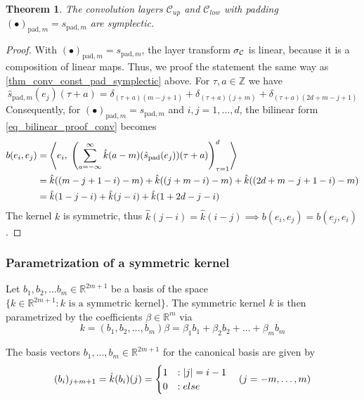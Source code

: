 \documentclass[twoside,a4paper]{article}
\newtheorem{theorem}{Theorem}
\begin{document}
\begin{theorem}
	The convolution layers $\mathcal{C}_{up}$ and $\mathcal{C}_{low}$
	with padding $(\bullet)_{\text{pad},m} = s_{\text{pad},m}$ are symplectic.
\end{theorem}
\begin{proof}
	With $(\bullet)_{\text{pad},m} = s_{\text{pad},m}$, the layer transform 
	$\sigma_{\mathcal{C}}$ is linear, because it is a composition of linear maps. Thus,
	we proof the statement the same way as \cref{thm_conv_const_pad_symplectic} above.
	For $\tau,a \in \mathbb{Z}$ we have
	\begin{equation*}
		\hat{s}_{\text{pad},m}(e_j)(\tau + a) = 
		\delta_{(\tau + a) (m-j+1)} + \delta_{(\tau + a) (j+m)} + \delta_{(\tau + a) (2d+m-j+1)}
	\end{equation*}
	Consequently, for $(\bullet)_{\text{pad},m} = s_{\text{pad},m}$ and $i,j=1, \dots, d$, 
	the bilinear form \cref{eq_bilinear_proof_conv} becomes
	\begin{align*}
		b(e_i, e_j) &= \left\langle e_i,\; 
			\left( \sum_{a=-\infty}^{\infty} 
				\hat{k}(a-m)
				(\hat{s}_{\text{pad}}(e_j))(\tau+a)
			\right)_{\tau=1}^d
		 \right\rangle \\
		&= \hat{k}((m-j+1-i)-m) + \hat{k}((j+m-i)-m) + \hat{k}((2d+m-j+1-i)-m) \\
		&= \hat{k}(1-j-i) + \hat{k}(j-i) + \hat{k}(1+2d-j-i)
	\end{align*}
	The kernel $k$ is symmetric, thus $\hat{k}(j-i) = \hat{k}(i-j) \implies b(e_i, e_j) = b(e_j,e_i)$.
\end{proof}

\subsubsection*{Parametrization of a symmetric kernel}

Let ${b_1, b_2, \dots b_m} \in \mathbb{R}^{2m+1}$ be a basis of the space 
$\{ k \in \mathbb{R}^{2m+1} : k \text{ is a symmetric kernel} \}$.
The symmetric kernel $k$ is then parametrized by the coefficients $\beta \in \mathbb{R}^m$ via
\begin{equation*}
	k = (b_1, b_2, \dots, b_m) \beta = \beta_1 b_1 + \beta_2 b_2 + \dots + \beta_m b_m
\end{equation*}

The basis vectors $b_1, \dots, b_m \in \mathbb{R}^{2m+1}$ for the canonical basis are given by
\begin{equation*}
	(b_i)_{j+m+1} = \hat{k}(b_i)(j) = \begin{cases}
		1 &: \left|{j}\right| = i-1 \\
		0 &:else
	\end{cases} 
	\quad (j=-m, \dots, m)
\end{equation*}
\end{document}
